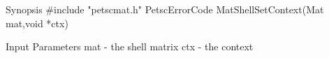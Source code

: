 Synopsis
#include "petscmat.h"
PetscErrorCode  MatShellSetContext(Mat mat,void *ctx)

Input Parameters
mat - the shell matrix
ctx - the context
